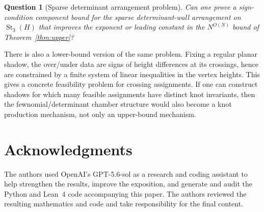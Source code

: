 \documentclass[11pt]{article}
\theoremstyle{remark}
\theoremstyle{plain}
\newtheorem{question}{Question}
\DeclareMathOperator{\St}{St}
\begin{document}
\begin{question}[Sparse determinant arrangement problem]
Can one prove a sign-condition component bound for the sparse determinant-wall
arrangement on \(\St_3(H)\) that improves the exponent or leading constant in
the \(N^{O(N)}\) bound of Theorem~\ref{thm:upper}?
\end{question}

There is also a lower-bound version of the same problem.  Fixing a regular
planar shadow, the over/under data are signs of height differences at its
crossings, hence are constrained by a finite system of linear inequalities in
the vertex heights.  This gives a concrete feasibility problem for crossing
assignments.  If one can construct shadows for which many feasible assignments
have distinct knot invariants, then the fewnomial/determinant chamber structure
would also become a knot production mechanism, not only an upper-bound
mechanism.

\section*{Acknowledgments}

The authors used OpenAI's GPT-5.6-sol as a research and coding assistant to
help strengthen the results, improve the exposition, and generate and audit
the Python and Lean~4 code accompanying this paper.  The authors reviewed the
resulting mathematics and code and take responsibility for the final content.
\end{document}
